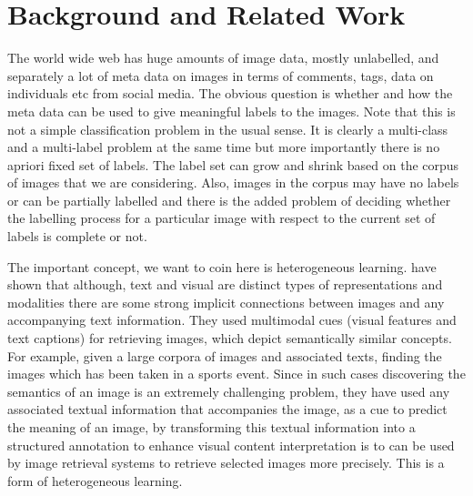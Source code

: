 
\chapter{Background and Related Work} %

\label{relatedWork} %


The world wide web has huge amounts of image data, mostly unlabelled, and separately a lot of meta data on images in terms of comments, tags,  data on individuals etc from social media. The obvious question is whether and how the meta data can be used to give meaningful labels to the images. Note that this is not a simple classification problem in the usual sense. It is clearly a multi-class and a multi-label problem at the same time but more importantly there is no apriori fixed set of labels. The label set can grow and shrink based on the corpus of images that we are considering. Also, images in the corpus may have no labels or can be partially labelled and there is the added problem of deciding whether the labelling process for a particular image with respect to the current set of labels is complete or not.
 
The important concept, we want to coin here is heterogeneous learning. 
\citet*{kesorn} have shown that although, text and visual are distinct types of representations and modalities there are some strong implicit connections between images and any accompanying text information. They used multimodal cues (visual features and text captions) for retrieving images, which depict semantically similar concepts. For example, given a large corpora of images and associated texts, finding the images which has been taken in a sports event.  Since in such cases discovering the semantics of an image is an extremely challenging problem, they have used any associated textual information that accompanies the image, as a cue to predict the meaning of an image, by transforming this textual information into a structured annotation  to enhance visual content interpretation is to can be used by image retrieval systems to retrieve selected images  more precisely. This is a form of heterogeneous learning. 


